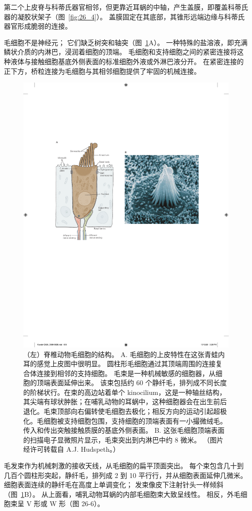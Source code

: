 第二个上皮脊与科蒂氏器官相邻，但更靠近耳蜗的中轴，产生盖膜，即覆盖科蒂氏器的凝胶状架子（图~\ref{fig:26_4}）。
盖膜固定在其底部，其锥形远端边缘与科蒂氏器官形成脆弱的连接。


毛细胞不是神经元； 它们缺乏树突和轴突（图~\ref{fig:26_5}A）。
一种特殊的盐溶液，即充满鳞状介质的内淋巴，浸润着细胞的顶端。
毛细胞和支持细胞之间的紧密连接将这种液体与接触细胞基底外侧表面的标准细胞外液或外淋巴液分开。
在紧密连接的正下方，桥粒连接为毛细胞与其相邻细胞提供了牢固的机械连接。


\begin{figure}[htbp]
	\centering
	\includegraphics[width=0.5\linewidth]{chap26/fig_26_5}
	\caption{（左）脊椎动物毛细胞的结构。
		A. 毛细胞的上皮特性在这张青蛙内耳的感觉上皮图中很明显。
		圆柱形毛细胞通过其顶端周围的连接复合体连接到相邻的支持细胞。
		毛束是一种机械敏感的细胞器，从细胞的顶端表面延伸出来。
		该束包括约 60 个静纤毛，排列成不同长度的阶梯状行。在束的高边站着单个 kinocilium，这是一种轴丝结构，其尖端有球状肿胀；在哺乳动物的耳蜗中，这种细胞器会在出生前后退化。毛束顶部向右偏转使毛细胞去极化；相反方向的运动引起超极化。毛细胞被支持细胞包围，支持细胞的顶端表面有一小撮微绒毛。传入和传出突触接触质膜的基底外侧表面。 
		B. 这张毛细胞顶端表面的扫描电子显微照片显示，毛束突出到内淋巴中约 8 微米。 （图片经许可转载自 A.J. Hudspeth。）}
	\label{fig:26_5}
\end{figure}


毛发束作为机械刺激的接收天线，从毛细胞的扁平顶面突出。
每个束包含几十到几百个圆柱形突起，静纤毛，排列成 2 到 10 平行行，并从细胞表面延伸几微米。
细胞表面连续的静纤毛在高度上单调变化；
发束像皮下注射针头一样倾斜（图~\ref{fig:26_5}B）。
从上面看，哺乳动物耳蜗的内部毛细胞束大致呈线性。 
相反，外毛细胞束呈 V 形或 W 形（图 26-6）。


